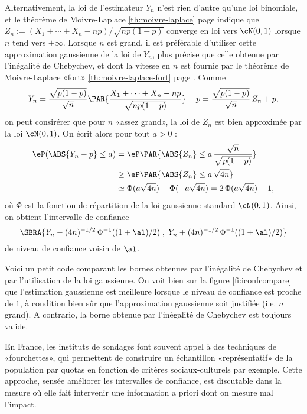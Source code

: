 Alternativement, la loi de l'estimateur $Y_n$ n'est rien d'autre qu'une loi
binomiale, et le théorème de Moivre-Laplace \ref{th:moivre-laplace} page
\pageref{th:moivre-laplace} indique que
$Z_n:=(X_1+\cdots+X_n-np)/\sqrt{np(1-p)}$ converge en loi vers $\cN(0,1)$
lorsque $n$ tend vers $+\infty$. Lorsque $n$ est grand, il est préférable
d'utiliser cette approximation gaussienne de la loi de $Y_n$, plus précise que
celle obtenue par l'inégalité de Chebychev, et dont la vitesse en $n$ est
fournie par le théorème de Moivre-Laplace «fort» \ref{th:moivre-laplace-fort}
page \pageref{th:moivre-laplace-fort}. Comme
$$
Y_n=\frac{\sqrt{p(1-p)}}{\sqrt{n}}\PAR{\frac{X_1+\cdots+X_n-np}{\sqrt{np(1-p)}}}+p
=\frac{\sqrt{p(1-p)}}{\sqrt{n}}\,Z_n+p,
$$
on peut consirérer que pour $n$ «assez grand», la loi de $Z_n$ est bien
approximée par la loi $\cN(0,1)$. On écrit alors pour tout $a>0$ :
\begin{align*}
  \eP(\ABS{Y_n-p} \leq a) 
  &= \eP\PAR{\ABS{Z_n} \leq a\,\frac{\sqrt{n}}{\sqrt{p(1-p)}}}\\
  &\geq \eP\PAR{\ABS{Z_n} \leq a\,\sqrt{4n}} \\
  &\simeq \Phi(a\sqrt{4n})-\Phi(-a\sqrt{4n}) = 2\,\Phi(a\sqrt{4n})-1,
\end{align*}
où $\Phi$ est la fonction de répartition de la loi gaussienne standard
$\cN(0,1)$. Ainsi, on obtient l'intervalle de confiance
$$
\SBRA{Y_n-(4n)^{-1/2}\,\Phi^{-1}((1+\al)/2)\;,\;Y_n+(4n)^{-1/2}\,\Phi^{-1}((1+\al)/2)}
$$
de niveau de confiance voisin de $\al$.

Voici un petit code \ML{} comparant les bornes obtenues par l'inégalité de
Chebychev et par l'utilisation de la loi gaussienne. On voit bien sur la
figure \ref{fi:iconfcompare} que l'estimation gaussienne est meilleure
lorsque le niveau de confiance est proche de $1$, à condition bien sûr que
l'approximation gaussienne soit justifiée (i.e. $n$ grand). A contrario, la
borne obtenue par l'inégalité de Chebychev est toujours valide.


\begin{rem}
  En France, les instituts de sondages font souvent appel à des techniques de
  «fourchettes», qui permettent de construire un échantillon «représentatif»
  de la population par quotas en fonction de critères sociaux-culturels par
  exemple.  Cette approche, sensée améliorer les intervalles de confiance, est
  discutable dans la mesure où elle fait intervenir une information a priori
  dont on mesure mal l'impact.
\end{rem}


